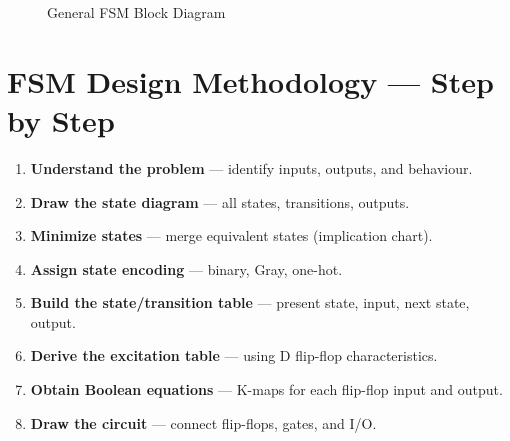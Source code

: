 \documentclass[12pt,a4paper]{article}
\begin{document}
\begin{figure}[H]
\centering
{}
\caption{General FSM Block Diagram}
\end{figure}


\section{FSM Design Methodology --- Step by Step}

\begin{tipbox}
\begin{enumerate}[leftmargin=*]
  \item \textbf{Understand the problem} --- identify inputs, outputs, and behaviour.
  \item \textbf{Draw the state diagram} --- all states, transitions, outputs.
  \item \textbf{Minimize states} --- merge equivalent states (implication chart).
  \item \textbf{Assign state encoding} --- binary, Gray, one-hot.
  \item \textbf{Build the state/transition table} --- present state, input, next state, output.
  \item \textbf{Derive the excitation table} --- using D flip-flop characteristics.
  \item \textbf{Obtain Boolean equations} --- K-maps for each flip-flop input and output.
  \item \textbf{Draw the circuit} --- connect flip-flops, gates, and I/O.
\end{enumerate}
\end{tipbox}
\end{document}
